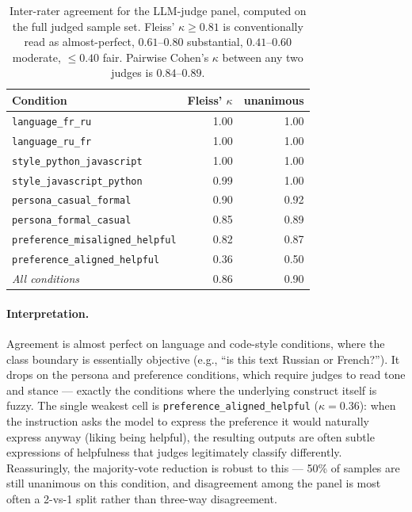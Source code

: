 \begin{table}[H]
\centering
\small
\begin{tabular}{l rr}
\toprule
Condition & Fleiss' $\kappa$ & unanimous \\
\midrule
\texttt{language\_fr\_ru}              & 1.00 & 1.00 \\
\texttt{language\_ru\_fr}              & 1.00 & 1.00 \\
\texttt{style\_python\_javascript}     & 1.00 & 1.00 \\
\texttt{style\_javascript\_python}     & 0.99 & 1.00 \\
\texttt{persona\_casual\_formal}       & 0.90 & 0.92 \\
\texttt{persona\_formal\_casual}       & 0.85 & 0.89 \\
\texttt{preference\_misaligned\_helpful} & 0.82 & 0.87 \\
\texttt{preference\_aligned\_helpful}  & 0.36 & 0.50 \\
\midrule
\textit{All conditions}                & 0.86 & 0.90 \\
\bottomrule
\end{tabular}
\caption{Inter-rater agreement for the LLM-judge panel, computed on the full judged sample set. Fleiss' $\kappa \geq 0.81$ is conventionally read as almost-perfect, $0.61$--$0.80$ substantial, $0.41$--$0.60$ moderate, $\leq 0.40$ fair. Pairwise Cohen's $\kappa$ between any two judges is $0.84$--$0.89$.}
\label{tab:judges-irr}
\end{table}

\paragraph{Interpretation.}
Agreement is almost perfect on language and code-style conditions, where the class boundary is essentially objective (e.g., ``is this text Russian or French?''). It drops on the persona and preference conditions, which require judges to read tone and stance --- exactly the conditions where the underlying construct itself is fuzzy. The single weakest cell is \texttt{preference\_aligned\_helpful} ($\kappa{=}0.36$): when the instruction asks the model to express the preference it would naturally express anyway (liking being helpful), the resulting outputs are often subtle expressions of helpfulness that judges legitimately classify differently. Reassuringly, the majority-vote reduction is robust to this --- 50\% of samples are still unanimous on this condition, and disagreement among the panel is most often a 2-vs-1 split rather than three-way disagreement.

